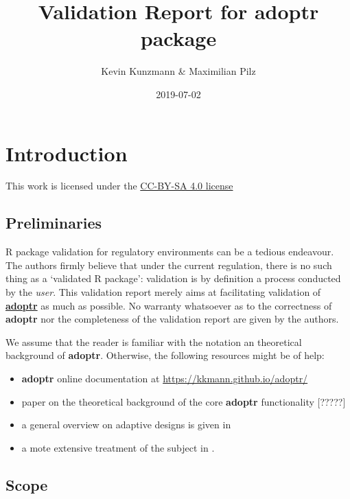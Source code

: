 \documentclass[]{book}
\title{Validation Report for \textbf{adoptr} package}
\author{Kevin Kunzmann \& Maximilian Pilz}
\date{2019-07-02}
\providecommand{\tightlist}{%
  \setlength{\itemsep}{0pt}\setlength{\parskip}{0pt}}
\begin{document}
\maketitle

{
\setcounter{tocdepth}{1}
\tableofcontents
}
\hypertarget{introduction}{%
\chapter{Introduction}\label{introduction}}

This work is licensed under the \href{https://creativecommons.org/licenses/by-sa/4.0/deed.en}{CC-BY-SA 4.0 license}

\hypertarget{preliminaries}{%
\section{Preliminaries}\label{preliminaries}}

R package validation for regulatory environments can be a
tedious endeavour.
The authors firmly believe that under the current regulation,
there is no such thing as a `validated R package':
validation is by definition a process conducted by the \emph{user}.
This validation report merely aims at facilitating
validation of \textbf{\href{https://github.com/kkmann/adoptr}{adoptr}} as
much as possible.
No warranty whatsoever as to the correctness of \textbf{adoptr} nor the
completeness of the validation report are given by the authors.

We assume that the reader is familiar with the notation an theoretical
background of \textbf{adoptr}.
Otherwise, the following resources might be of help:

\begin{itemize}
\tightlist
\item
  \textbf{adoptr} online documentation at \url{https://kkmann.github.io/adoptr/}
\item
  paper on the theoretical background of the core \textbf{adoptr} functionality {[}?????{]}
\item
  a general overview on adaptive designs is given in \citep{Bauer2015}
\item
  a mote extensive treatment of the subject in \citep{Wassmer2016}.
\end{itemize}

\hypertarget{scope}{%
\section{Scope}\label{scope}}
\end{document}
